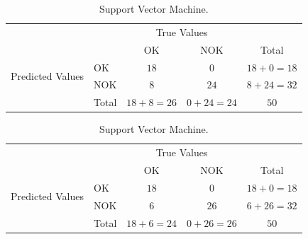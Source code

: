 \documentclass[5p,times,procedia]{elsarticle}
\begin{document}
\begin{table}
       \begin{subtable}[h]{0.3\textwidth}
              \centering
              \begin{adjustbox}{width=1.6\textwidth}
              \begin{tabular}{l|l|c|c|c}
                     \multicolumn{2}{c}{}&\multicolumn{2}{c}{True Values}&\\
                     \cline{3-4}
                     \multicolumn{2}{c|}{}& OK & NOK &\multicolumn{1}{c}{Total}\\
                     \cline{2-4}
                     \multirow{2}{*}{Predicted Values}& OK & $18$ & $0$ & $18+0 = 18$\\
                     \cline{2-4}
                     & NOK & $8$ & $24$ & $8+24 = 32$\\
                     \cline{2-4}
                     \multicolumn{1}{c}{} & \multicolumn{1}{c}{Total} & \multicolumn{1}{c}{$18+8 = 26$} & \multicolumn{    1}{c}{$0+24 = 24$} & \multicolumn{1}{c}{$50$}\\
              \end{tabular}
              \end{adjustbox}
              \caption{Support Vector Machine.}
              \label{tab:SVM_conf_matrix}
       \end{subtable}
       \begin{subtable}[h]{0.3\textwidth}
              \centering
              \begin{adjustbox}{width=1.6\textwidth}
              \begin{tabular}{l|l|c|c|c}
                     \multicolumn{2}{c}{}&\multicolumn{2}{c}{True Values}&\\
                     \cline{3-4}
                     \multicolumn{2}{c|}{}& OK & NOK &\multicolumn{1}{c}{Total}\\
                     \cline{2-4}
                     \multirow{2}{*}{Predicted Values}& OK & $18$ & $0$ & $18+0 = 18$\\
                     \cline{2-4}
                     & NOK & $6$ & $26$ & $6+26 = 32$\\
                     \cline{2-4}
                     \multicolumn{1}{c}{} & \multicolumn{1}{c}{Total} & \multicolumn{1}{c}{$18+6 = 24$} & \multicolumn{    1}{c}{$0+26 = 26$} & \multicolumn{1}{c}{$50$}\\
              \end{tabular}
              \end{adjustbox}

\end{subtable}
\end{table}
\end{document}
